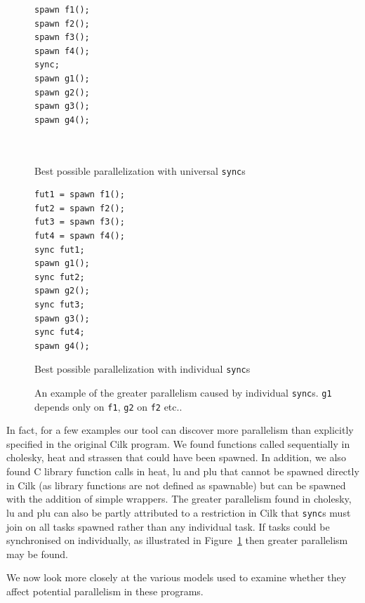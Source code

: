 \begin{figure}
  \begin{center}
  \small
  \begin{subfloat}
    \begin{minipage}{1.4in}
      \begin{verbatim}
spawn f1();
spawn f2();
spawn f3();
spawn f4();
sync;
spawn g1();
spawn g2();
spawn g3();
spawn g4();



      \end{verbatim}
    \end{minipage}%
    \label{without}
    \caption{Best possible parallelization with universal \texttt{sync}s}
  \end{subfloat}%
  \qquad
  \begin{subfloat}
    \begin{minipage}{1.4in}
      \begin{verbatim}
fut1 = spawn f1();
fut2 = spawn f2();
fut3 = spawn f3();
fut4 = spawn f4();
sync fut1;
spawn g1();
sync fut2;
spawn g2();
sync fut3;
spawn g3();
sync fut4;
spawn g4();
      \end{verbatim}
    \end{minipage}%
    \label{with}
    \caption{Best possible parallelization with individual \texttt{sync}s}
  \end{subfloat}%
  \end{center}
  \caption{An example of the greater parallelism caused by individual \texttt{sync}s.
      \texttt{g1} depends only on \texttt{f1}, \texttt{g2} on \texttt{f2} etc.. }
  \label{cilk-sync}
\end{figure}


In fact, for a few examples our tool can discover more parallelism than explicitly specified in the original Cilk program.
We found functions called sequentially in cholesky, heat and strassen that could have been spawned.
In addition, we also found C library function calls in heat, lu and plu that cannot be spawned directly in Cilk (as library functions are not defined as spawnable) but can be spawned with the addition of simple wrappers.
The greater parallelism found in cholesky, lu and plu can also be partly attributed to a restriction in Cilk that \texttt{sync}s must join on all tasks spawned rather than any individual task.
If tasks could be synchronised on individually, as illustrated in Figure~\ref{cilk-sync} then greater parallelism may be found.

We now look more closely at the various models used to examine whether they affect potential parallelism in these programs.

